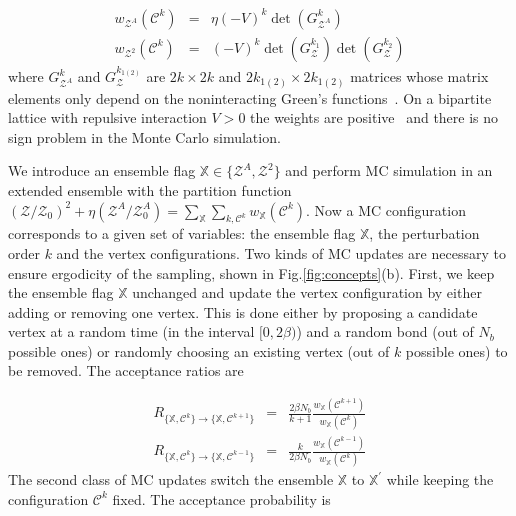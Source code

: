\documentclass[12pt,onecolumn,english,prl,showpacs,nofootinbib]{revtex4-1}
\begin{document}
\begin{eqnarray}
w_{\mathcal{Z}^{A}}(\mathcal{C}^{k}) &=& \eta (-V)^{k} \det(G^{k}_{\mathcal{Z}^{A}})  \label{eq:ZAweight} \\
w_{\mathcal{Z}^{2}}(\mathcal{C}^{k}) &= & (-V)^{k} \det(G^{k_{1}}_{\mathcal{Z}}) \det(G^{k_{2}}_{\mathcal{Z}})
\label{eq:Z2weight}
\end{eqnarray}
where $G^{k}_{\mathcal{Z}^{A}}$ and $G_{\mathcal{Z}}^{k_{1(2)}}$ are $2k\times 2k$ and $2k_{1(2)}\times 2k_{1(2)}$ matrices whose matrix elements only depend on the noninteracting Green's functions~\cite{SM}. On a bipartite lattice with repulsive interaction $V>0$ the weights are positive~\cite{Huffman:2014fj, CTQMCpaper} and there is no sign problem in the Monte Carlo simulation. 


We introduce an ensemble flag $\mathbb{X}\in \{\mathcal{Z}^{A}, \mathcal{Z}^{2}\}$ and perform MC simulation in an extended ensemble \cite{Burovski:2006hv, Humeniuk:2012cq} with the partition function $(\mathcal{Z}/\mathcal{Z}_{0})^{2} + \eta (\mathcal{Z}^{A}/\mathcal{Z}_{0}^{A}) = \sum_{\mathbb{X}}\sum_{k, \mathcal{C}^{k}}w_\mathbb{X} (\mathcal{C}^{k})$. Now a MC configuration corresponds to a given set of variables: the ensemble flag $\mathbb{X}$, the perturbation order $k$ and the vertex configurations. Two kinds of MC updates are necessary to ensure ergodicity of the sampling, shown in Fig.{\ref{fig:concepts}}(b). First, we keep the ensemble flag $\mathbb{X}$ unchanged and update the vertex configuration by either adding or removing one vertex. This is done either by proposing a candidate vertex at a random time (in the interval $[0, 2\beta)$) and a random bond (out of $N_{b}$ possible ones) or randomly choosing an existing vertex (out of $k$ possible ones) to be removed. The acceptance ratios are

\begin{eqnarray}
R_{\{\mathbb{X}, \mathcal{C}^{k}\}\rightarrow \{\mathbb{X}, \mathcal{C}^{k+1}\}} & =&  \frac{2\beta  N_{b}}{k+1} \frac{w_\mathbb{X}(\mathcal{C}^{k+1})}{w_\mathbb{X}(\mathcal{C}^{k})} \label{eq:add} \\
R_{\{\mathbb{X}, \mathcal{C}^{k}\}\rightarrow \{\mathbb{X}, \mathcal{C}^{k-1}\}} & =&  \frac{k}{2\beta  N_{b}} \frac{w_\mathbb{X}(\mathcal{C}^{k-1})}{w_\mathbb{X}(\mathcal{C}^{k})} \label{eq:remove}
\end{eqnarray}
The second class of MC updates switch the ensemble $\mathbb{X}$ to $\mathbb{X}^{\prime}$ while keeping the configuration $\mathcal{C}^{k}$ fixed. The acceptance probability is
\end{document}
